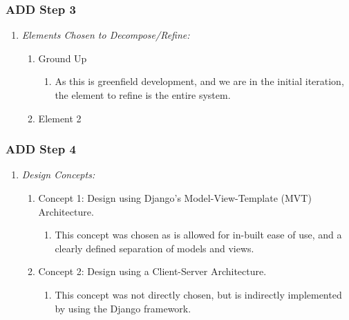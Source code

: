 \documentclass[11pt]{article}
\begin{document}
        \subsubsection{ADD Step 3}
            \begin{enumerate}
                \item \textit{Elements Chosen to Decompose/Refine:}
                    \begin{enumerate}
                        \item Ground Up
                            \begin{enumerate}
                                \item As this is greenfield development, and we are in the initial iteration, the element to refine is the entire system.
                            \end{enumerate}
                        \item Element 2
                    \end{enumerate}
            \end{enumerate}
        \subsubsection{ADD Step 4}
            \begin{enumerate}
                \item \textit{Design Concepts:}
                    \begin{enumerate}
                        \item Concept 1: Design using Django's Model-View-Template (MVT) Architecture.
                            \begin{enumerate}
                                \item This concept was chosen as is allowed for in-built ease of use, and a clearly defined separation of models and views.
                            \end{enumerate}
                        \item Concept 2: Design using a Client-Server Architecture.
                            \begin{enumerate}
                                \item This concept was not directly chosen, but is indirectly implemented by using the Django framework.
                            \end{enumerate}
                    \end{enumerate}
            \end{enumerate}
\end{document}
